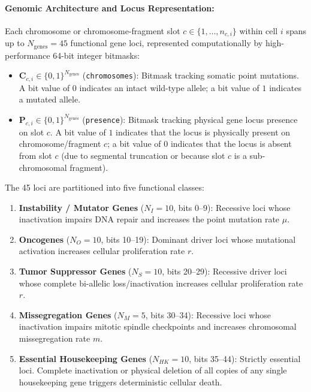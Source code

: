 \documentclass[11pt,a4paper]{article}
\begin{document}
\paragraph{Genomic Architecture and Locus Representation:}
Each chromosome or chromosome-fragment slot $c \in \{1, \dots, n_{c, i}\}$ within cell $i$ spans up to $N_{\text{genes}} = 45$ functional gene loci, represented computationally by high-performance 64-bit integer bitmasks:
\begin{itemize}
    \item $\mathbf{C}_{c, i} \in \{0, 1\}^{N_{\text{genes}}}$ (\texttt{chromosomes}): Bitmask tracking somatic point mutations. A bit value of $0$ indicates an intact wild-type allele; a bit value of $1$ indicates a mutated allele.
    \item $\mathbf{P}_{c, i} \in \{0, 1\}^{N_{\text{genes}}}$ (\texttt{presence}): Bitmask tracking physical gene locus presence on slot $c$. A bit value of $1$ indicates that the locus is physically present on chromosome/fragment $c$; a bit value of $0$ indicates that the locus is absent from slot $c$ (due to segmental truncation or because slot $c$ is a sub-chromosomal fragment).
\end{itemize}
The 45 loci are partitioned into five functional classes:
\begin{enumerate}
    \item \textbf{Instability / Mutator Genes} ($N_I = 10$, bits 0--9): Recessive loci whose inactivation impairs DNA repair and increases the point mutation rate $\mu$.
    \item \textbf{Oncogenes} ($N_O = 10$, bits 10--19): Dominant driver loci whose mutational activation increases cellular proliferation rate $r$.
    \item \textbf{Tumor Suppressor Genes} ($N_S = 10$, bits 20--29): Recessive driver loci whose complete bi-allelic loss/inactivation increases cellular proliferation rate $r$.
    \item \textbf{Missegregation Genes} ($N_M = 5$, bits 30--34): Recessive loci whose inactivation impairs mitotic spindle checkpoints and increases chromosomal missegregation rate $m$.
    \item \textbf{Essential Housekeeping Genes} ($N_{HK} = 10$, bits 35--44): Strictly essential loci. Complete inactivation or physical deletion of all copies of any single housekeeping gene triggers deterministic cellular death.
\end{enumerate}
\end{document}
